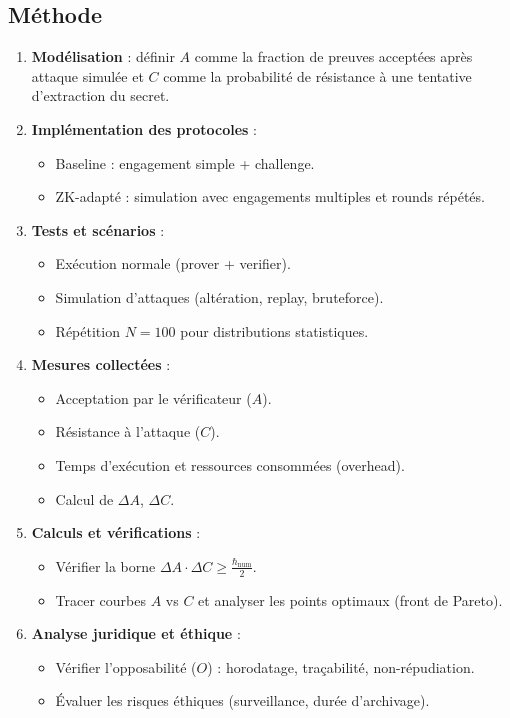 \documentclass[12pt,a4paper]{report}
\begin{document}
{	\subsection*{Méthode}
	\begin{enumerate}
		\item \textbf{Modélisation} : définir $A$ comme la fraction de preuves acceptées après attaque simulée et $C$ comme la probabilité de résistance à une tentative d’extraction du secret.
		\item \textbf{Implémentation des protocoles} :
		\begin{itemize}
			\item Baseline : engagement simple + challenge.
			\item ZK-adapté : simulation avec engagements multiples et rounds répétés.
		\end{itemize}
		\item \textbf{Tests et scénarios} :
		\begin{itemize}
			\item Exécution normale (prover + verifier).
			\item Simulation d’attaques (altération, replay, bruteforce).
			\item Répétition $N=100$ pour distributions statistiques.
		\end{itemize}
		\item \textbf{Mesures collectées} :
		\begin{itemize}
			\item Acceptation par le vérificateur ($A$).
			\item Résistance à l’attaque ($C$).
			\item Temps d’exécution et ressources consommées (overhead).
			\item Calcul de $\Delta A$, $\Delta C$.
		\end{itemize}
		\item \textbf{Calculs et vérifications} :
		\begin{itemize}
			\item Vérifier la borne $\Delta A \cdot \Delta C \geq \frac{\hbar_{\text{num}}}{2}$.
			\item Tracer courbes $A$ vs $C$ et analyser les points optimaux (front de Pareto).
		\end{itemize}
		\item \textbf{Analyse juridique et éthique} :
		\begin{itemize}
			\item Vérifier l’opposabilité ($O$) : horodatage, traçabilité, non-répudiation.
			\item Évaluer les risques éthiques (surveillance, durée d’archivage).
		\end{itemize}
	\end{enumerate}
	
}
\end{document}
